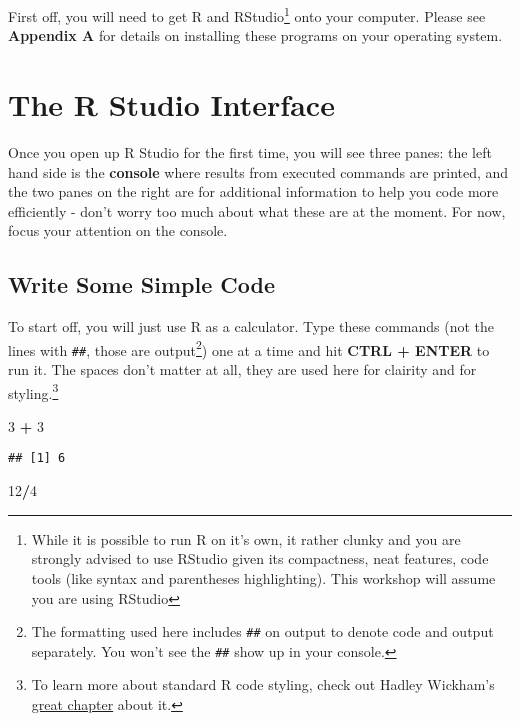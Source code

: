 \documentclass[]{book}
\newenvironment{Shaded}{\begin{snugshade}}{\end{snugshade}}
\newcommand{\DecValTok}[1]{\textcolor[rgb]{0.00,0.00,0.81}{#1}}
\newcommand{\StringTok}[1]{\textcolor[rgb]{0.31,0.60,0.02}{#1}}
\newcommand{\OperatorTok}[1]{\textcolor[rgb]{0.81,0.36,0.00}{\textbf{#1}}}
\let\rmarkdownfootnote\footnote%
\def\footnote{\protect\rmarkdownfootnote}
\theoremstyle{definition}
\theoremstyle{definition}
\theoremstyle{definition}
\theoremstyle{remark}
\begin{document}
First off, you will need to get R and RStudio\footnote{While it is
  possible to run R on it's own, it rather clunky and you are strongly
  advised to use RStudio given its compactness, neat features, code
  tools (like syntax and parentheses highlighting). This workshop will
  assume you are using RStudio} onto your computer. Please see
\textbf{Appendix A} for details on installing these programs on your
operating system.

\section{The R Studio Interface}\label{the-r-studio-interface}

Once you open up R Studio for the first time, you will see three panes:
the left hand side is the \textbf{console} where results from executed
commands are printed, and the two panes on the right are for additional
information to help you code more efficiently - don't worry too much
about what these are at the moment. For now, focus your attention on the
console.

\subsection{Write Some Simple Code}\label{write-some-simple-code}

To start off, you will just use R as a calculator. Type these commands
(not the lines with \texttt{\#\#}, those are output\footnote{The
  formatting used here includes \texttt{\#\#} on output to denote code
  and output separately. You won't see the \texttt{\#\#} show up in your
  console.}) one at a time and hit \textbf{CTRL + ENTER} to run it. The
spaces don't matter at all, they are used here for clairity and for
styling.\footnote{To learn more about standard R code styling, check out
  Hadley Wickham's \href{http://adv-r.had.co.nz/Style.html}{great
  chapter} about it.}

\begin{Shaded}
\begin{Highlighting}[]
\DecValTok{3} \OperatorTok{+}\StringTok{ }\DecValTok{3}
\end{Highlighting}
\end{Shaded}

\begin{verbatim}
## [1] 6
\end{verbatim}

\begin{Shaded}
\begin{Highlighting}[]
\DecValTok{12}\OperatorTok{/}\DecValTok{4}
\end{Highlighting}
\end{Shaded}
\end{document}
